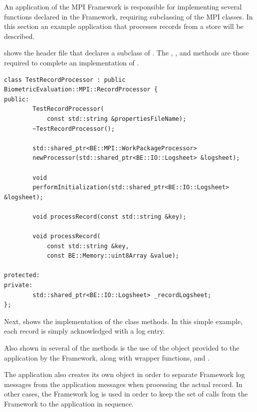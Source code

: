 An application of the MPI Framework is responsible for implementing several
functions declared in the Framework, requiring subclassing of the MPI classes.
In this section an example application that processes records from a store will
be described. 

 shows the header file that declares a subclass of
. The ,
, and  methods are those
required to complete an implementation of .

\begin{lstlisting}[caption={MPI Framework Application Classes}, label=lst:mpiappclasses]
class TestRecordProcessor : public BiometricEvaluation::MPI::RecordProcessor {
public:
        TestRecordProcessor(
            const std::string &propertiesFileName);
        ~TestRecordProcessor();

        std::shared_ptr<BE::MPI::WorkPackageProcessor>
        newProcessor(std::shared_ptr<BE::IO::Logsheet> &logsheet);

        void
        performInitialization(std::shared_ptr<BE::IO::Logsheet> &logsheet);

        void processRecord(const std::string &key);

        void processRecord(
            const std::string &key,
            const BE::Memory::uint8Array &value);

protected:
private:
        std::shared_ptr<BE::IO::Logsheet> _recordLogsheet;
};

\end{lstlisting}

Next,  shows the implementation of the class methods. In
this simple example, each record is simply acknowledged with a log entry.

Also shown in several of the methods is the use of the  object
provided to the application by the Framework, along with wrapper functions,
 and .

The application also creates its own
 object in order to separate Framework log messages from the
application messages when processing the actual record. In other cases, the
Framework log is used in order to keep the set of calls from the Framework
to the application in sequence.

